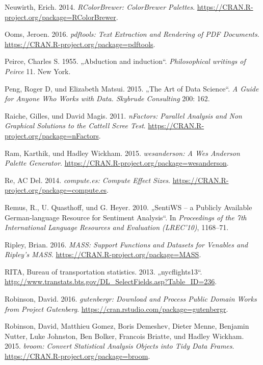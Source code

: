 \documentclass[12pt,ngerman,]{book}
\theoremstyle{definition}
\theoremstyle{definition}
\theoremstyle{remark}
\begin{document}
\hypertarget{ref-R-RColorBrewer}{}
Neuwirth, Erich. 2014. \emph{RColorBrewer: ColorBrewer Palettes}.
\url{https://CRAN.R-project.org/package=RColorBrewer}.

\hypertarget{ref-R-pdftools}{}
Ooms, Jeroen. 2016. \emph{pdftools: Text Extraction and Rendering of PDF
Documents}. \url{https://CRAN.R-project.org/package=pdftools}.

\hypertarget{ref-peirce1955abduction}{}
Peirce, Charles S. 1955. „Abduction and induction``. \emph{Philosophical
writings of Peirce} 11. New York.

\hypertarget{ref-peng2015art}{}
Peng, Roger D, und Elizabeth Matsui. 2015. „The Art of Data Science``.
\emph{A Guide for Anyone Who Works with Data. Skybrude Consulting} 200:
162.

\hypertarget{ref-R-nFactors}{}
Raiche, Gilles, und David Magis. 2011. \emph{nFactors: Parallel Analysis
and Non Graphical Solutions to the Cattell Scree Test}.
\url{https://CRAN.R-project.org/package=nFactors}.

\hypertarget{ref-R-wesanderson}{}
Ram, Karthik, und Hadley Wickham. 2015. \emph{wesanderson: A Wes
Anderson Palette Generator}.
\url{https://CRAN.R-project.org/package=wesanderson}.

\hypertarget{ref-R-compute.es}{}
Re, AC Del. 2014. \emph{compute.es: Compute Effect Sizes}.
\url{https://CRAN.R-project.org/package=compute.es}.

\hypertarget{ref-remquahey2010}{}
Remus, R., U. Quasthoff, und G. Heyer. 2010. „SentiWS -- a Publicly
Available German-language Resource for Sentiment Analysis``. In
\emph{Proceedings of the 7th International Language Resources and
Evaluation (LREC'10)}, 1168--71.

\hypertarget{ref-R-MASS}{}
Ripley, Brian. 2016. \emph{MASS: Support Functions and Datasets for
Venables and Ripley's MASS}.
\url{https://CRAN.R-project.org/package=MASS}.

\hypertarget{ref-nycflights13}{}
RITA, Bureau of transportation statistics. 2013. „nycflights13``.
\url{http://www.transtats.bts.gov/DL_SelectFields.asp?Table_ID=236}.

\hypertarget{ref-R-gutenbergr}{}
Robinson, David. 2016. \emph{gutenbergr: Download and Process Public
Domain Works from Project Gutenberg}.
\url{https://cran.rstudio.com/package=gutenbergr}.

\hypertarget{ref-R-broom}{}
Robinson, David, Matthieu Gomez, Boris Demeshev, Dieter Menne, Benjamin
Nutter, Luke Johnston, Ben Bolker, Francois Briatte, und Hadley Wickham.
2015. \emph{broom: Convert Statistical Analysis Objects into Tidy Data
Frames}. \url{https://CRAN.R-project.org/package=broom}.
\end{document}
